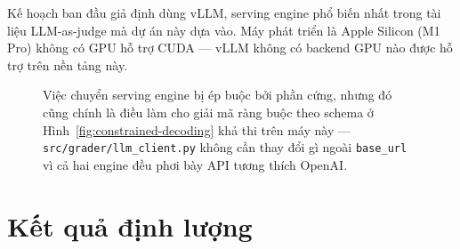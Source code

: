 \documentclass[11pt,a4paper]{article}
\begin{document}
Kế hoạch ban đầu giả định dùng vLLM, serving engine phổ biến nhất trong
tài liệu LLM-as-judge mà dự án này dựa vào. Máy phát triển là Apple Silicon
(M1 Pro) không có GPU hỗ trợ CUDA — vLLM không có backend GPU nào được hỗ
trợ trên nền tảng này.

\begin{figure}[htbp]
\centering
{}
\caption{Việc chuyển serving engine bị ép buộc bởi phần cứng, nhưng đó
cũng chính là điều làm cho giải mã ràng buộc theo schema ở
Hình~\ref{fig:constrained-decoding} khả thi trên máy này —
\texttt{src/grader/llm\_client.py} không cần thay đổi gì ngoài
\texttt{base\_url} vì cả hai engine đều phơi bày API tương thích OpenAI.}
\label{fig:pivot}
\end{figure}

\section{Kết quả định lượng}
\end{document}
